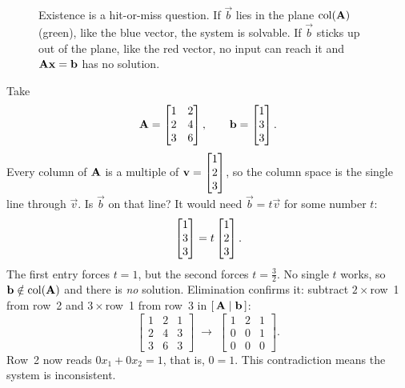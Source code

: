 \begin{figure}[htbp]
\centering
{}
\caption{Existence is a hit-or-miss question. If $\vec b$ lies in the plane
$\operatorname{col}(\mathbf{A})$ (green), like the blue vector, the system is solvable. If $\vec b$ sticks
up out of the plane, like the red vector, no input can reach it and $\mathbf{A}\mathbf{x}=\mathbf{b}$
has no solution.}
\label{ch13:existence}
\end{figure}

\begin{example}
\label{ch13:incon}
Take
\[
  \mathbf{A}=\begin{bmatrix}1&2\\2&4\\3&6\end{bmatrix},\qquad
  \mathbf{b}=\begin{bmatrix}1\\3\\3\end{bmatrix}.
\]
Every column of $\mathbf{A}$ is a multiple of $\mathbf{v}=\begin{bmatrix}1\\2\\3\end{bmatrix}$, so the column
space is the single line through $\vec{v}$. Is $\vec{b}$ on that line? It would need
$\vec{b}=t\vec{v}$ for some number $t$:
\[
  \begin{bmatrix}1\\3\\3\end{bmatrix}=t\begin{bmatrix}1\\2\\3\end{bmatrix}.
\]
The first entry forces $t=1$, but the second forces $t=\tfrac32$. No
single $t$ works, so $\mathbf{b}\notin\operatorname{col}(\mathbf{A})$ and there is \emph{no}
solution. Elimination confirms it: subtract $2\times$row~1 from row~2 and $3\times$row~1
from row~3 in $[\,\mathbf{A}\mid\mathbf{b}\,]$:
\[
  \left[\begin{array}{cc|c}1&2&1\\2&4&3\\3&6&3\end{array}\right]
  \;\longrightarrow\;
  \left[\begin{array}{cc|c}1&2&1\\0&0&1\\0&0&0\end{array}\right].
\]
Row~2 now reads $0x_1+0x_2=1$, that is, $0=1$. This contradiction means the system is
inconsistent.
\end{example}

